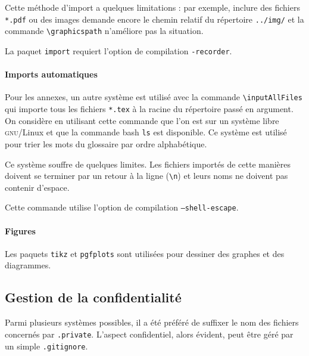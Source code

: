 {Cette méthode d'import a quelques limitations : par exemple, inclure des fichiers \texttt{*.pdf} ou des images demande encore le chemin relatif du répertoire \texttt{../img/} et la commande \texttt{\textbackslash{}graphicspath} n'améliore pas la situation.

La paquet \texttt{import} requiert l'option de compilation \texttt{-recorder}.
\paragraph*{Imports automatiques}
Pour les annexes, un autre système est utilisé avec la commande \texttt{\textbackslash{}inputAllFiles} qui importe tous les fichiers \texttt{*.tex} à la racine du répertoire passé en argument. On considère en utilisant cette commande que l'on est sur un système libre \textsc{gnu}/Linux et que la commande bash \texttt{ls} est disponible. Ce système est utilisé pour trier les mots du glossaire par ordre alphabétique.

Ce système souffre de quelques limites. Les fichiers importés de cette manières doivent se terminer par un retour à la ligne (\texttt{\textbackslash{}n}) et leurs noms ne doivent pas contenir d'espace.

Cette commande utilise l'option de compilation \texttt{--shell-escape}.

\paragraph*{Figures}
Les paquets \texttt{tikz} et \texttt{pgfplots} sont utilisées pour dessiner des graphes et des diagrammes.

\subsection*{Gestion de la confidentialité}
Parmi plusieurs systèmes possibles, il a été préféré de suffixer le nom des fichiers concernés par \texttt{.private}. L'aspect confidentiel, alors évident, peut être géré par un simple \texttt{.gitignore}.
}